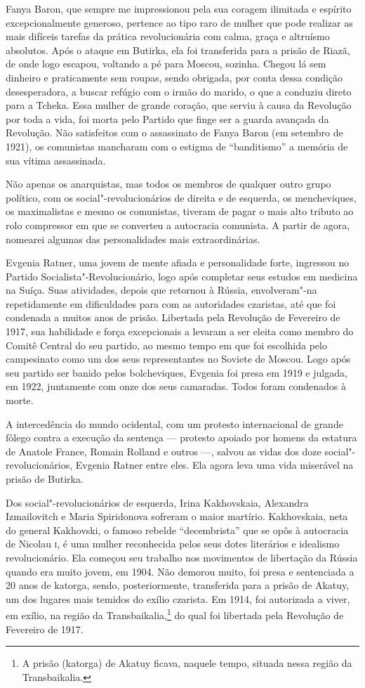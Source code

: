 Fanya Baron, que sempre me impressionou pela sua coragem ilimitada e
espírito excepcionalmente generoso, pertence ao tipo raro de mulher que
pode realizar as mais difíceis tarefas da prática revolucionária com
calma, graça e altruísmo absolutos. Após o ataque em Butirka, ela foi
transferida para a prisão de Riazã, de onde logo escapou, voltando a pé
para Moscou, sozinha. Chegou lá sem dinheiro e praticamente
sem roupas, sendo obrigada, por conta dessa condição desesperadora, a
buscar refúgio com o irmão do marido, o que a conduziu direto para a Tcheka.
Essa mulher de grande coração, que serviu à causa da Revolução por toda
a vida, foi morta pelo Partido que finge ser a guarda avançada da
Revolução. Não satisfeitos com o assassinato de Fanya Baron (em setembro
de 1921), os comunistas mancharam com o estigma de ``banditismo'' a
memória de sua vítima assassinada.

Não apenas os anarquistas, mas todos os membros de qualquer outro grupo
político, com os social"-revolucionários de direita e de esquerda, os
mencheviques, os maximalistas e mesmo os comunistas, tiveram de pagar
o mais alto tributo ao rolo compressor em que se converteu a autocracia comunista. A partir de agora, nomearei algumas das personalidades mais extraordinárias.

Evgenia Ratner, uma jovem de mente afiada e personalidade forte,
ingressou no Partido Socialista"-Revolucionário, logo após completar seus
estudos em medicina na Suíça. Suas atividades, depois que retornou à
Rússia, envolveram"-na repetidamente em dificuldades para com as
autoridades czaristas, até que foi condenada a muitos anos de prisão.
Libertada pela Revolução de Fevereiro de 1917, sua habilidade e força
excepcionais a levaram a ser eleita como membro do Comitê Central do seu
partido, ao mesmo tempo em que foi escolhida pelo campesinato como
um dos seus representantes no Soviete de Moscou. Logo após seu partido
ser banido pelos bolcheviques, Evgenia foi presa em 1919 e julgada, em
1922, juntamente com onze dos seus camaradas. Todos foram condenados à morte.

A intercedência do mundo ocidental, com um protesto internacional de
grande fôlego contra a execução da sentença --- protesto apoiado por homens da estatura de
Anatole France, Romain Rolland e outros ---, salvou as vidas dos doze
social"-revolucionários, Evgenia Ratner entre eles. Ela agora leva uma
vida miserável na prisão de Butirka.

Dos social"-revolucionários de esquerda, Irina Kakhovskaia,
Alexandra Izmailovitch e Maria Spiridonova sofreram o maior martírio.
Kakhovskaia, neta do general Kakhovski, o famoso rebelde ``decembrista''
que se opôs à autocracia de Nicolau \textsc{i}, é uma mulher reconhecida pelos
seus dotes literários e idealismo revolucionário. Ela começou seu
trabalho nos movimentos de libertação da Rússia quando era muito jovem,
em 1904. Não demorou muito, foi presa e sentenciada a 20 anos de
katorga, sendo, posteriormente, transferida para a prisão de Akatuy, um dos lugares
mais temidos do exílio czarista. Em 1914, foi autorizada a viver, em
exílio, na região da Transbaikalia,\footnote{A prisão (katorga) de Akatuy ficava, naquele tempo, situada nessa região da Transbaikalia.} do qual foi libertada pela Revolução
de Fevereiro de 1917.


